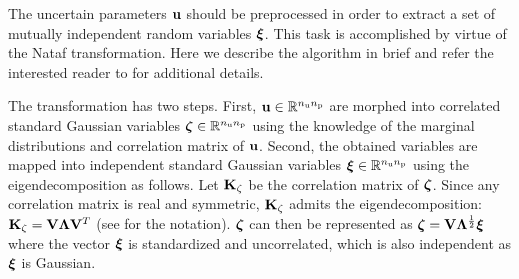 The uncertain parameters $\mathbf{u}$ should be preprocessed in order to extract a set of mutually independent random variables $\bm{\xi}$.
This task is accomplished by virtue of the Nataf transformation.
Here we describe the algorithm in brief and refer the interested reader to \cite{li2008} for additional details.

The transformation has two steps.
First, $\mathbf{u} \in \mathbb{R}^{{n_\text{u}} {n_\text{p}}}$ are morphed into correlated standard Gaussian variables $\bm{\zeta} \in \mathbb{R}^{{n_\text{u}} {n_\text{p}}}$ using the knowledge of the marginal distributions and correlation matrix of $\mathbf{u}$.
Second, the obtained variables are mapped into independent standard Gaussian variables $\bm{\xi} \in \mathbb{R}^{{n_\text{u}} {n_\text{p}}}$ using the eigendecomposition as follows.
Let $\mathbf{K}_\zeta$ be the correlation matrix of $\bm{\zeta}$.
Since any correlation matrix is real and symmetric, $\mathbf{K}_\zeta$ admits the eigendecomposition: $\mathbf{K}_\zeta = \mathbf{V} \mathbf{\Lambda} \mathbf{V}^T$ (see  for the notation).
$\bm{\zeta}$ can then be represented as $\bm{\zeta} = \mathbf{V} \mathbf{\Lambda}^\frac{1}{2} \bm{\xi}$ where the vector $\bm{\xi}$ is standardized and uncorrelated, which is also independent as $\bm{\xi}$ is Gaussian.
